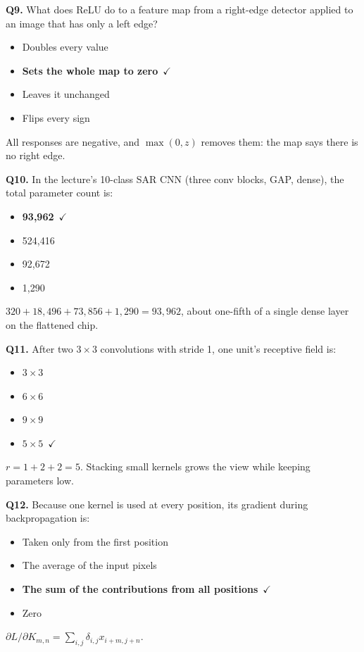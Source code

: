 \documentclass[11pt]{article}
\begin{document}
{\noindent\textbf{Q9.} What does ReLU do to a feature map from a right-edge detector applied to an image that has only a left edge?\begin{itemize}[leftmargin=2.2em,itemsep=0pt,topsep=1pt]\item[A.] Doubles every value\item[\textbf{B.}] \textbf{Sets the whole map to zero}~{\color{GrnN}$\checkmark$}\item[C.] Leaves it unchanged\item[D.] Flips every sign\end{itemize} All responses are negative, and $\max(0,z)$ removes them: the map says there is no right edge.\par\medskip

\noindent\textbf{Q10.} In the lecture's 10-class SAR CNN (three conv blocks, GAP, dense), the total parameter count is:\begin{itemize}[leftmargin=2.2em,itemsep=0pt,topsep=1pt]\item[\textbf{A.}] \textbf{93,962}~{\color{GrnN}$\checkmark$}\item[B.] 524,416\item[C.] 92,672\item[D.] 1,290\end{itemize} $320+18{,}496+73{,}856+1{,}290=93{,}962$, about one-fifth of a single dense layer on the flattened chip.\par\medskip

\noindent\textbf{Q11.} After two $3\times3$ convolutions with stride 1, one unit's receptive field is:\begin{itemize}[leftmargin=2.2em,itemsep=0pt,topsep=1pt]\item[A.] $3\times3$\item[B.] $6\times6$\item[C.] $9\times9$\item[\textbf{D.}] \textbf{$5\times5$}~{\color{GrnN}$\checkmark$}\end{itemize} $r=1+2+2=5$. Stacking small kernels grows the view while keeping parameters low.\par\medskip

\noindent\textbf{Q12.} Because one kernel is used at every position, its gradient during backpropagation is:\begin{itemize}[leftmargin=2.2em,itemsep=0pt,topsep=1pt]\item[A.] Taken only from the first position\item[B.] The average of the input pixels\item[\textbf{C.}] \textbf{The sum of the contributions from all positions}~{\color{GrnN}$\checkmark$}\item[D.] Zero\end{itemize} $\partial L/\partial K_{m,n}=\sum_{i,j}\delta_{i,j}x_{i+m,j+n}$.\par\medskip

}
\end{document}

